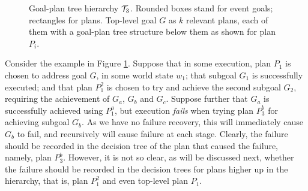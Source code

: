 \begin{figure}[t]
\begin{center}

\end{center}
\caption{Goal-plan tree hierarchy ${\mathcal{T}}_3$. Rounded boxes stand for event goals; rectangles for
plans. Top-level goal $G$ as $k$ relevant plans, each of them with a goal-plan
tree structure below them as shown for plan $P_i$.}
%
\label{fig:T3}
\end{figure}

Consider the example in Figure \ref{fig:T3}. 
%
Suppose that in some execution, plan $P_1$ is chosen to address goal $G$, in some world state $w_1$;
that subgoal $G_1$ is successfully executed; and that plan $P_1^2$ is chosen to try and achieve
the second subgoal $G_2$, requiring the achievement of $G_a$, $G_b$ and $G_c$.
%
Suppose further that $G_a$ is successfully achieved using $P_1^a$, but execution \emph{fails}
when trying plan $P_3^b$ for achieving subgoal $G_b$.  As we have no failure recovery, this will
immediately cause $G_b$ to fail, and recursively will cause failure at each stage. 
%
Clearly, the failure should be recorded in the decision tree of the plan that caused the
failure, namely, plan $P_3^b$. However, it is not so clear, as will be discussed next, whether the
failure should be recorded in the decision trees for plans higher up in the hierarchy, that is,
plan $P_1^2$ and even top-level plan $P_1$.

